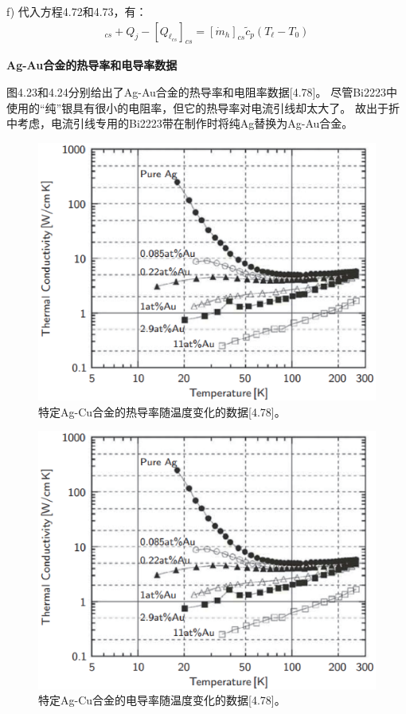 f) 代入方程4.72和4.73，有：
\begin{align*}%
[Q_\ell]_{cs}+Q_j-[Q_{\ell_{cs}}]_{cs}=[\dot{m}_h]_{cs}\tilde{c}_p(T_\ell-T_0) \tag{4.74}
\end{align*}

\textbf{Ag-Au合金的热导率和电导率数据}

图4.23和4.24分别给出了Ag-Au合金的热导率和电阻率数据[4.78]。
尽管Bi2223中使用的“纯”银具有很小的电阻率，但它的热导率对电流引线却太大了。
故出于折中考虑，电流引线专用的Bi2223带在制作时将纯Ag替换为Ag-Au合金。

\begin{figure}[htbp]
	\centering
	\includegraphics[scale=0.65]{chpt4/figs/fig4.23.eps}
	\caption{特定Ag-Cu合金的热导率随温度变化的数据[4.78]。}
\end{figure}
\begin{figure}[htbp]
	\centering
	\includegraphics[scale=0.65]{chpt4/figs/fig4.23.eps}
	\caption{特定Ag-Cu合金的电导率随温度变化的数据[4.78]。}
\end{figure}

